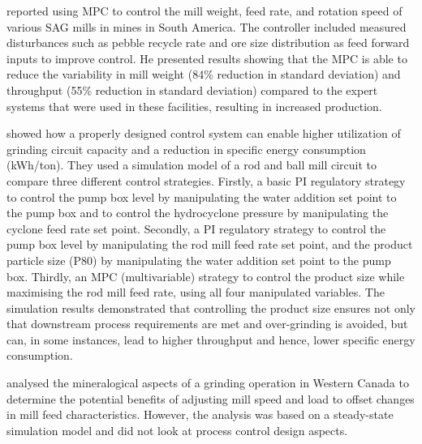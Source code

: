 \cite{gough_sag_2015} reported using \gls{MPC} to control the mill weight, feed rate, and rotation speed of various \acrshort{SAG} mills in mines in South America. The controller included measured disturbances such as pebble recycle rate and ore size distribution as feed forward inputs to improve control. He presented results showing that the \gls{MPC} is able to reduce the variability in mill weight (84\% reduction in standard deviation) and throughput (55\% reduction in standard deviation) compared to the expert systems that were used in these facilities, resulting in increased production.

\cite{bouchard_reducing_2017} showed how a properly designed control system can enable higher utilization of grinding circuit capacity and a reduction in specific energy consumption (\acrshort{kWh}/ton). They used a simulation model of a rod and ball mill circuit to compare three different control strategies. Firstly, a basic \gls{PI} regulatory strategy to control the pump box level by manipulating the water addition set point to the pump box and to control the hydrocyclone pressure by manipulating the cyclone feed rate set point. Secondly, a \gls{PI} regulatory strategy to control the pump box level by manipulating the rod mill feed rate set point, and the product particle size (\acrshort{P80}) by manipulating the water addition set point to the pump box. Thirdly, an \gls{MPC} (multivariable) strategy to control the product size while maximising the rod mill feed rate, using all four manipulated variables. The simulation results demonstrated that controlling the product size ensures not only that downstream process requirements are met and over-grinding is avoided, but can, in some instances, lead to higher throughput and hence, lower specific energy consumption.

\cite{liu_development_2018} analysed the mineralogical aspects of a grinding operation in Western Canada to determine the potential benefits of adjusting mill speed and load to offset changes in mill feed characteristics. However, the analysis was based on a steady-state simulation model and did not look at process control design aspects.


%

